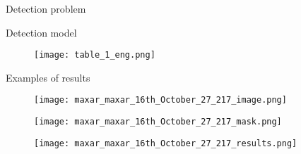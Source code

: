 \documentclass{beamer}
\begin{document}
\begin{section}{Detection problem}
\begin{frame}{Detection model}
\begin{figure}[H]
	\centering
	\texttt{[image: table\_1\_eng.png]}
\end{figure}

\end{frame}

\begin{frame}{Examples of results}
\begin{figure}[H]
	\centering
	\texttt{[image: maxar\_maxar\_16th\_October\_27\_217\_image.png]}
\end{figure}

\begin{figure}
	\centering
	\begin{minipage}{0.5\textwidth}
		\texttt{[image: maxar\_maxar\_16th\_October\_27\_217\_mask.png]}
	\end{minipage}%
	\begin{minipage}{0.5\textwidth}
		\texttt{[image: maxar\_maxar\_16th\_October\_27\_217\_results.png]}
	\end{minipage}
\end{figure}

\end{frame}

\end{section}
\end{document}
